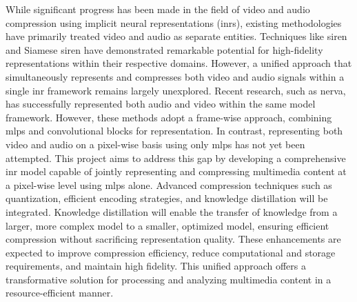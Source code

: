 While significant progress has been made in the field of video and audio compression using implicit neural representations (\gls{inr}s), existing methodologies have primarily treated video and audio as separate entities. Techniques like \gls{siren} and Siamese \gls{siren} have demonstrated remarkable potential for high-fidelity representations within their respective domains. However, a unified approach that simultaneously represents and compresses both video and audio signals within a single \gls{inr} framework remains largely unexplored. Recent research, such as \gls{nerva}, has successfully represented both audio and video within the same model framework. However, these methods adopt a frame-wise approach, combining \gls{mlp}s and convolutional blocks for representation. In contrast, representing both video and audio on a pixel-wise basis using only \gls{mlp}s has not yet been attempted. This project aims to address this gap by developing a comprehensive \gls{inr} model capable of jointly representing and compressing multimedia content at a pixel-wise level using \gls{mlp}s alone. Advanced compression techniques such as quantization, efficient encoding strategies, and knowledge distillation will be integrated. Knowledge distillation will enable the transfer of knowledge from a larger, more complex model to a smaller, optimized model, ensuring efficient compression without sacrificing representation quality. These enhancements are expected to improve compression efficiency, reduce computational and storage requirements, and maintain high fidelity. This unified approach offers a transformative solution for processing and analyzing multimedia content in a resource-efficient manner.
\pagebreak
